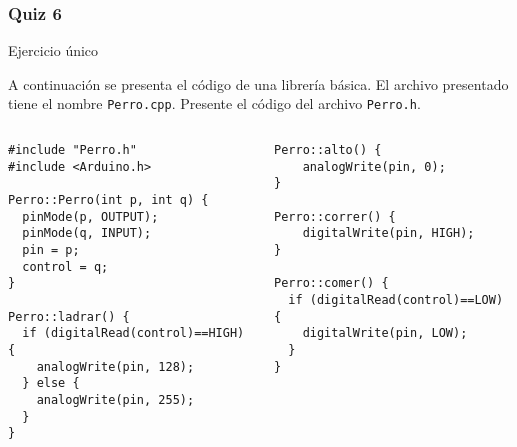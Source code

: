 \documentclass{beamer}
\begin{document}
\begin{frame}[fragile=singleslide]\frametitle{Quiz 6}

\begin{block}{Ejercicio único}
\begin{small}
A continuación se presenta el código de una librería básica. El archivo presentado tiene el nombre \verb|Perro.cpp|. Presente el código del archivo \verb|Perro.h|. 
\end{small}
\end{block}

\vspace{-0.3in}
\begin{columns}[t]

\begin{scriptsize}
\begin{verbatim}
#include "Perro.h"
#include <Arduino.h>

Perro::Perro(int p, int q) {
  pinMode(p, OUTPUT);
  pinMode(q, INPUT);
  pin = p;
  control = q;
}

Perro::ladrar() {
  if (digitalRead(control)==HIGH) {
  	analogWrite(pin, 128);
  } else {
  	analogWrite(pin, 255);	
  }
}
\end{verbatim}
\end{scriptsize}

\begin{scriptsize}
\begin{verbatim}
Perro::alto() {
	analogWrite(pin, 0);
}

Perro::correr() {
	digitalWrite(pin, HIGH);
}

Perro::comer() {
  if (digitalRead(control)==LOW) {
  	digitalWrite(pin, LOW);
  }
}
\end{verbatim}
\end{scriptsize}

\end{columns}
\end{frame}
\end{document}

